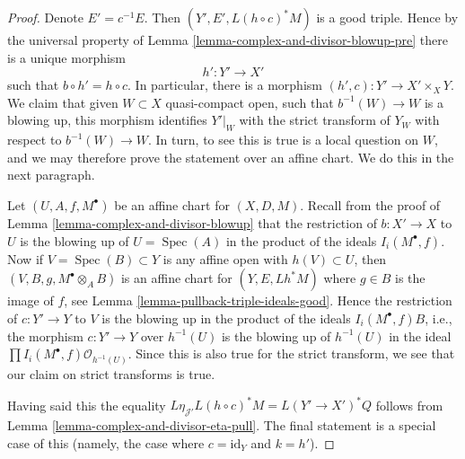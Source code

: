 \documentclass[10pt,a4paper]{amsart}
\theoremstyle{plain}
\theoremstyle{definition}
\theoremstyle{remark}
\numberwithin{equation}{subsection}
\def\Spec{\mathop{\mathrm{Spec}}}
\begin{document}
\begin{proof}
Denote $E' = c^{-1}E$. Then $(Y', E', L(h \circ c)^*M)$ is a good
triple. Hence by the universal property of
Lemma \ref{lemma-complex-and-divisor-blowup-pre}
there is a unique morphism
$$
h' : Y' \longrightarrow X'
$$
such that $b \circ h' = h \circ c$. In particular, there is a morphism
$(h', c) : Y' \to X' \times_X Y$. We claim that given $W \subset X$
quasi-compact open, such that $b^{-1}(W) \to W$ is a blowing up,
this morphism identifies $Y'|_W$ with the strict transform of $Y_W$
with respect to $b^{-1}(W) \to W$. In turn, to see this is true
is a local question on $W$, and we may therefore prove the
statement over an affine chart. We do this in the next paragraph.

\medskip\noindent
Let $(U, A, f, M^\bullet)$ be an affine chart for $(X, D, M)$.
Recall from the proof of Lemma \ref{lemma-complex-and-divisor-blowup}
that the restriction of $b : X' \to X$ to $U$ is the blowing
up of $U = \Spec(A)$ in the product of the ideals $I_i(M^\bullet, f)$.
Now if $V = \Spec(B) \subset Y$ is any affine open with $h(V) \subset U$,
then $(V, B, g, M^\bullet \otimes_A B)$ is an affine chart for
$(Y, E, Lh^*M)$ where $g \in B$ is the image of $f$, see
Lemma \ref{lemma-pullback-triple-ideals-good}.
Hence the restriction of $c : Y' \to Y$ to $V$
is the blowing up in the product of the ideals
$I_i(M^\bullet, f)B$, i.e., the morphism $c : Y' \to Y$ over
$h^{-1}(U)$ is the blowing up of $h^{-1}(U)$ in the
ideal $\prod I_i(M^\bullet, f) \mathcal{O}_{h^{-1}(U)}$.
Since this is also true for the strict transform, we see that
our claim on strict transforms is true.

\medskip\noindent
Having said this the equality
$L\eta_{\mathcal{J}'}L(h \circ c)^*M = L(Y' \to X')^*Q$
follows from
Lemma \ref{lemma-complex-and-divisor-eta-pull}.
The final statement is a special case of this
(namely, the case where $c = \text{id}_Y$ and $k = h'$).
\end{proof}
\end{document}
